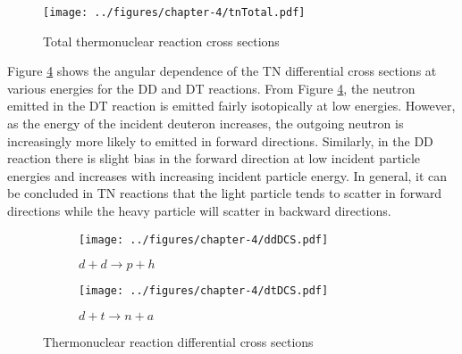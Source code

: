 \begin{figure}[!htb]
    \centering
    \texttt{[image: ../figures/chapter-4/tnTotal.pdf]}
    \caption{Total thermonuclear reaction cross sections}
    \label{fig:tnTotal}
\end{figure}

Figure \ref{fig:tnDiffernetialCrossSections} shows the angular dependence of the TN differential cross sections at various energies for the DD and DT reactions. From Figure \ref{fig:tnDiffernetialCrossSections}, the neutron emitted in the DT reaction is emitted fairly isotopically at low energies. However, as the energy of the incident deuteron increases, the outgoing neutron is increasingly more likely to emitted in forward directions. Similarly, in the DD reaction there is slight bias in the forward direction at low incident particle energies and increases with increasing incident particle energy. In general, it can be concluded in TN reactions that the light particle tends to scatter in forward directions while the heavy particle will scatter in backward directions.

\begin{figure}[!htb]
  \centering
  \begin{subfigure}{.45\textwidth}
    \centering
    \texttt{[image: ../figures/chapter-4/ddDCS.pdf]}
    \caption{$d + d \rightarrow p + h$}
    \label{fig:ddDCS}
  \end{subfigure}%
  \begin{subfigure}{.45\textwidth}
    \centering
    \texttt{[image: ../figures/chapter-4/dtDCS.pdf]}
    \caption{$d + t \rightarrow n + a$}
    \label{fig:dtDCS}
  \end{subfigure}
  \caption{Thermonuclear reaction differential cross sections}
  \label{fig:tnDiffernetialCrossSections}
\end{figure}